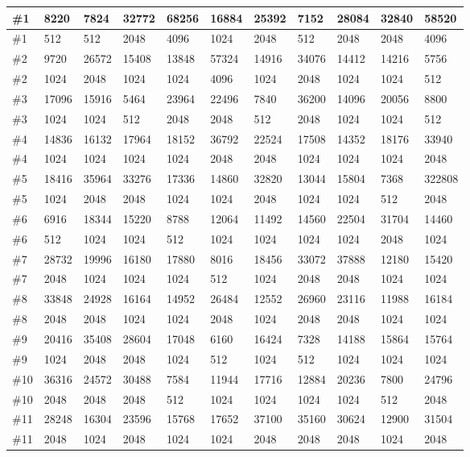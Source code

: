 \begin{center}
    \begin{tabular}{ | l | l | l | l | l | l | l | l | l | l | l | }
    \hline
    \#1 & 8220 & 7824 & 32772 & 68256 & 16884 & 25392 & 7152 & 28084 & 32840 & 58520 \\  \hline
    \#1 & 512 & 512 & 2048 & 4096 & 1024 & 2048 & 512 & 2048 & 2048 & 4096 \\ \hline \hline
    \#2 & 9720 & 26572 & 15408 & 13848 & 57324 & 14916 & 34076 & 14412 & 14216 & 5756 \\ \hline
    \#2 & 1024 & 2048 & 1024 & 1024 & 4096 & 1024 & 2048 & 1024 & 1024 & 512 \\ \hline
    \#3 & 17096 & 15916 & 5464 & 23964 & 22496 & 7840 & 36200 & 14096 & 20056 & 8800 \\ \hline
    \#3 & 1024 & 1024 & 512 & 2048 & 2048 & 512 & 2048 & 1024 & 1024 & 512 \\ \hline
    \#4 & 14836 & 16132 & 17964 & 18152 & 36792 & 22524 & 17508 & 14352 & 18176 & 33940 \\ \hline
    \#4 & 1024 & 1024 & 1024 & 1024 & 2048 & 2048 & 1024 & 1024 & 1024 & 2048 \\ \hline
    \#5 & 18416 & 35964 & 33276 & 17336 & 14860 & 32820 & 13044 & 15804 & 7368 & 322808 \\ \hline
    \#5 & 1024 & 2048 & 2048 & 1024 & 1024 & 2048 & 1024 & 1024 & 512 & 2048 \\ \hline
    \#6 & 6916 & 18344 & 15220 & 8788 & 12064 & 11492 & 14560 & 22504 & 31704 & 14460 \\ \hline
    \#6 & 512 & 1024 & 1024 & 512 & 1024 & 1024 & 1024 & 1024 & 2048 & 1024 \\ \hline
    \#7 & 28732 & 19996 & 16180 & 17880 & 8016 & 18456 & 33072 & 37888 & 12180 & 15420 \\ \hline
    \#7 & 2048 & 1024 & 1024 & 1024 & 512 & 1024 & 2048 & 2048 & 1024 & 1024 \\ \hline
    \#8 & 33848 & 24928 & 16164 & 14952 & 26484 & 12552 & 26960 & 23116 & 11988 & 16184 \\ \hline
    \#8 & 2048 & 2048 & 1024 & 1024 & 2048 & 1024 & 2048 & 2048 & 1024 & 1024 \\ \hline
    \#9 & 20416 & 35408 & 28604 & 17048 & 6160 & 16424 & 7328 & 14188 & 15864 & 15764 \\ \hline
    \#9 & 1024 & 2048 & 2048 & 1024 & 512 & 1024 & 512 & 1024 & 1024 & 1024 \\ \hline
    \#10 & 36316 & 24572 & 30488 & 7584 & 11944 & 17716 & 12884 & 20236 & 7800 & 24796 \\ \hline
    \#10 & 2048 & 2048 & 2048 & 512 & 1024 & 1024 & 1024 & 1024 & 512 & 2048 \\ \hline
    \#11 & 28248 & 16304 & 23596 & 15768 & 17652 & 37100 & 35160 & 30624 & 12900 & 31504 \\ \hline
    \#11 & 2048 & 1024 & 2048 & 1024 & 1024 & 2048 & 2048 & 2048 & 1024 & 2048 \\ \hline
    \end{tabular}
\end{center}

